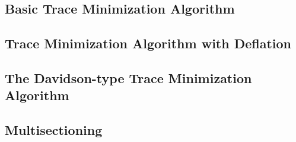 \subsection{Basic Trace Minimization Algorithm}

\subsection{Trace Minimization Algorithm with Deflation}

\subsection{The Davidson-type Trace Minimization Algorithm}

\subsection{Multisectioning}